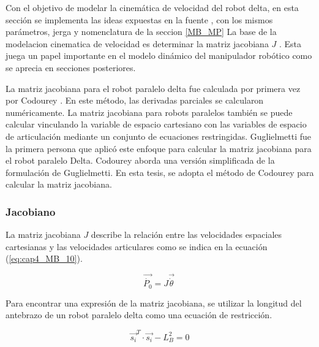         Con el objetivo de modelar la cinemática de velocidad del robot delta, en esta sección se implementa las ideas expuestas en la fuente \cite{Path_Planning_and_Trajectory_Optimization},  con los mismos parámetros, jerga y nomenclatura de la seccion  \ref{MB_MP}
        La base de la modelacion cinematica de velocidad es determinar la matriz jacobiana  \( J \) . Esta juega un papel importante en el modelo dinámico del manipulador robótico como se aprecia en secciones posteriores.\par
        
        La matriz jacobiana para el robot paralelo delta fue calculada por primera vez por Codourey \cite{Codourey:31400}. En este método, las derivadas parciales se calcularon numéricamente. La matriz jacobiana para robots paralelos también se puede calcular vinculando la variable de espacio cartesiano con las variables de espacio de articulación mediante un conjunto de ecuaciones restringidas. Guglielmetti \cite{Guglielmetti:31706} fue la primera persona que aplicó este enfoque para calcular la matriz jacobiana para el robot paralelo Delta. Codourey \cite{DynamicCodourey} aborda una versión simplificada de la formulación de Guglielmetti. En esta tesis, se adopta el método de Codourey para calcular la matriz jacobiana.

        \subsubsection{Jacobiano}

        La matriz jacobiana $J$ describe la relación entre las velocidades espaciales cartesianas y las velocidades articulares como se indica en la ecuación (\ref{eq:cap4_MB_10}).

        \begin{equation} 
            \overrightarrow{\dot{P_{0}}}=J\overrightarrow{\dot{ \theta }}~ 
            \label{eq:cap4_MB_10}
        \end{equation}  
   
        Para encontrar una expresión de la matriz jacobiana, se utilizar la longitud del antebrazo de un robot paralelo delta como una ecuación de restricción.

        \begin{equation} 
            \overrightarrow{s_{i}}^T \cdot \overrightarrow{s_{i}} - L_{B}^{2} = 0
            \label{eq:cap4_MB_11}
        \end{equation} 

